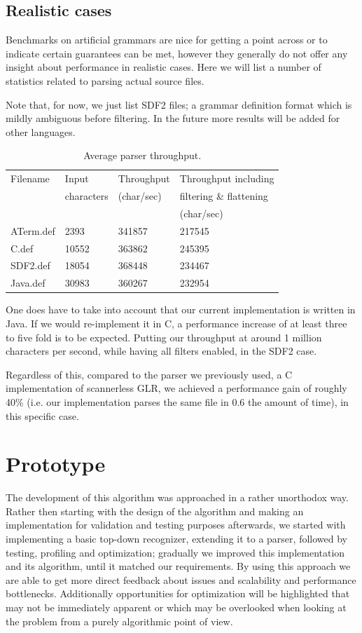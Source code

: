 \documentclass[a4paper,10pt]{article}
\begin{document}
\subsection{Realistic cases}

Benchmarks on artificial grammars are nice for getting a point across or to indicate certain guarantees can be met, however they generally do not offer any insight about performance in realistic cases. Here we will list a number of statistics related to parsing actual source files.

Note that, for now, we just list SDF2 files; a grammar definition format which is mildly ambiguous before filtering. In the future more results will be added for other languages.

\begin{table}[H]
\centering
\begin{tabular}{ | p{5em} | p{5em} | p{6em} | p{10em} |}
  \hline
  Filename & Input & Throughput & Throughput including\\
   & characters & (char/sec) & filtering \& flattening\\
   & & & (char/sec)\\
  \hline
  ATerm.def & 2393 & 341857 & 217545\\
  C.def & 10552 & 363862 & 245395\\
  SDF2.def & 18054 & 368448 & 234467\\
  Java.def & 30983 & 360267 & 232954\\
  \hline
\end{tabular}
\caption{Average parser throughput.}
\end{table}

One does have to take into account that our current implementation is written in Java. If we would re-implement it in C, a performance increase of at least three to five fold is to be expected. Putting our throughput at around 1 million characters per second, while having all filters enabled, in the SDF2 case.

Regardless of this, compared to the parser we previously used, a C implementation of scannerless GLR, we achieved a performance gain of roughly 40\% (i.e. our implementation parses the same file in 0.6 the amount of time), in this specific case.

\section{Prototype}

The development of this algorithm was approached in a rather unorthodox way. Rather then starting with the design of the algorithm and making an implementation for validation and testing purposes afterwards, we started with implementing a basic top-down recognizer, extending it to a parser, followed by testing, profiling and optimization; gradually we improved this implementation and its algorithm, until it matched our requirements. By using this approach we are able to get more direct feedback about issues and scalability and performance bottlenecks. Additionally opportunities for optimization will be highlighted that may not be immediately apparent or which may be overlooked when looking at the problem from a purely algorithmic point of view.
\end{document}
